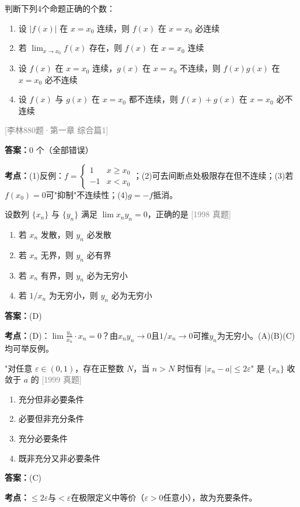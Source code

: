 \documentclass[12pt,a4paper]{ctexbook}
\newcommand{\src}[1]{\hfill\textcolor{gray}{\small\textsf{[#1]}}}
\newcommand{\ans}[1]{\begin{answerbox}\textbf{答案：}#1\end{answerbox}}
\newcommand{\kpt}[1]{\textbf{考点：}#1}
\begin{document}
\begin{exercise}
判断下列4个命题正确的个数：
\begin{enumerate}[label=(\arabic*),nosep]
  \item 设 $|f(x)|$ 在 $x=x_0$ 连续，则 $f(x)$ 在 $x=x_0$ 必连续
  \item 若 $\lim_{x\to x_0}f(x)$ 存在，则 $f(x)$ 在 $x=x_0$ 连续
  \item 设 $f(x)$ 在 $x=x_0$ 连续，$g(x)$ 在 $x=x_0$ 不连续，则 $f(x)g(x)$ 在 $x=x_0$ 必不连续
  \item 设 $f(x)$ 与 $g(x)$ 在 $x=x_0$ 都不连续，则 $f(x)+g(x)$ 在 $x=x_0$ 必不连续
\end{enumerate}
\src{李林880题·第一章 综合篇1}
\end{exercise}
\ans{0 个（全部错误）}
\kpt{(1)反例：$f=\begin{cases}1&x\geqslant x_0\\-1&x<x_0\end{cases}$；(2)可去间断点处极限存在但不连续；(3)若$f(x_0)=0$可"抑制"不连续性；(4)$g=-f$抵消。}

\bigskip

\begin{exercise}[1998 数学二·第1题]
设数列 $\{x_n\}$ 与 $\{y_n\}$ 满足 $\lim x_ny_n=0$，正确的是 \hfill\src{1998 真题}
\begin{enumerate}[label=(\Alph*),nosep]
  \item 若 $x_n$ 发散，则 $y_n$ 必发散
  \item 若 $x_n$ 无界，则 $y_n$ 必有界
  \item 若 $x_n$ 有界，则 $y_n$ 必为无穷小
  \item 若 $1/x_n$ 为无穷小，则 $y_n$ 必为无穷小
\end{enumerate}
\end{exercise}
\ans{(D)}
\kpt{(D)：$\lim\frac{y_n}{x_n}\cdot x_n=0$？由$x_ny_n\to 0$且$1/x_n\to 0$可推$y_n$为无穷小。(A)(B)(C)均可举反例。}

\bigskip

\begin{exercise}
"对任意 $\varepsilon\in(0,1)$，存在正整数 $N$，当 $n>N$ 时恒有 $|x_n-a|\leqslant 2\varepsilon$" 是 $\{x_n\}$ 收敛于 $a$ 的 \hfill\src{1999 真题}
\begin{enumerate}[label=(\Alph*),nosep]
  \item 充分但非必要条件
  \item 必要但非充分条件
  \item 充分必要条件
  \item 既非充分又非必要条件
\end{enumerate}
\end{exercise}
\ans{(C)}
\kpt{$\leqslant 2\varepsilon$与$<\varepsilon$在极限定义中等价（$\varepsilon>0$任意小），故为充要条件。}
\end{document}
